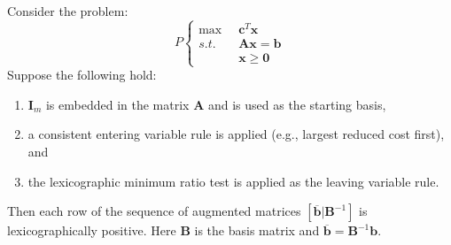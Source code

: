 \begin{lemma} Consider the problem:
\begin{displaymath}
P\left\{
\begin{aligned}
\max\;\; & \mathbf{c}^T\mathbf{x}\\
s.t.\;\; & \mathbf{A}\mathbf{x} = \mathbf{b}\\
& \mathbf{x} \geq \mathbf{0}
\end{aligned}\right.
\end{displaymath}
Suppose the following hold:
\begin{enumerate}
\item $\mathbf{I}_m$ is embedded in the matrix $\mathbf{A}$ and is used as the starting basis, 
\item a consistent entering variable rule is applied (e.g., largest reduced cost first), and
\item the lexicographic minimum ratio test is applied as the leaving variable rule.
\end{enumerate}
Then each row of the sequence of augmented matrices $[\overline{\mathbf{b}} |\mathbf{B}^{-1}]$ is lexicographically positive. Here $\mathbf{B}$ is the basis matrix and $\overline{\mathbf{b}} = \mathbf{B}^{-1}\mathbf{b}$.
\label{lem:LexiPositiveTableau}
\end{lemma}
